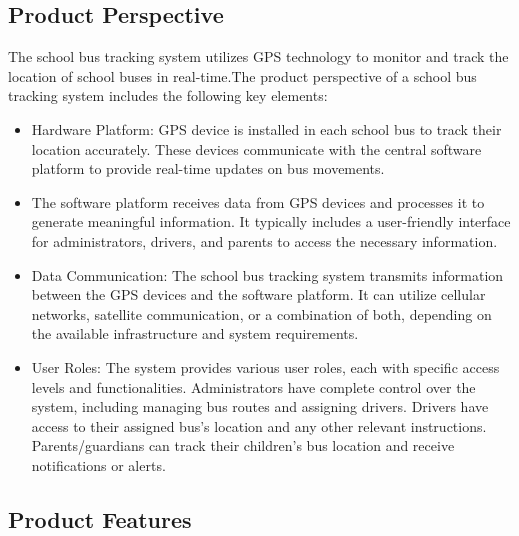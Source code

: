 \documentclass{article}
\begin{document}
\subsection{Product Perspective}
The school bus tracking system utilizes GPS technology to monitor and track the location of school buses in real-time.The product perspective of a school bus tracking system includes the following key elements:
\begin{itemize}
  \item Hardware Platform: GPS device is  installed in each school bus to track their location accurately. These devices communicate with the central software platform to provide real-time updates on bus movements.
  \item The software platform receives data from GPS devices and processes it to generate meaningful information. It typically includes a user-friendly interface for administrators, drivers, and parents to access the necessary information. 
  \item  Data Communication: The school bus tracking system  transmits information between the GPS devices and the software platform. It can utilize cellular networks, satellite communication, or a combination of both, depending on the available infrastructure and system requirements.
  \item  User Roles: The system provides various user roles, each with specific access levels and functionalities. Administrators have complete control over the system, including managing bus routes and assigning drivers. Drivers have access to their assigned bus's location and any other relevant instructions. Parents/guardians can track their children's bus location and receive notifications or alerts.

\end{itemize}
\subsection{Product Features}
\end{document}

